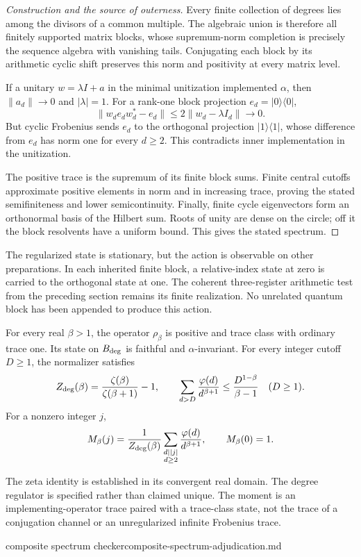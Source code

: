 \begin{proof}[Construction and the source of outerness]
Every finite collection of degrees lies among the divisors of a common
multiple. The algebraic union is therefore all finitely supported matrix
blocks, whose supremum-norm completion is precisely the sequence algebra
with vanishing tails. Conjugating each block by its arithmetic cyclic
shift preserves this norm and positivity at every matrix level.

If a unitary $w=\lambda I+a$ in the minimal unitization implemented
$\alpha$, then $\|a_d\|\to0$ and $|\lambda|=1$. For a rank-one block
projection $e_d=|0\rangle\langle0|$,
\[
 \|w_d e_d w_d^*-e_d\|\leq2\|w_d-\lambda I_d\|\longrightarrow0.
\]
But cyclic Frobenius sends $e_d$ to the orthogonal projection
$|1\rangle\langle1|$, whose difference from $e_d$ has norm one for
every $d\geq2$. This contradicts inner implementation in the unitization.

The positive trace is the supremum of its finite block sums. Finite
central cutoffs approximate positive elements in norm and in increasing
trace, proving the stated semifiniteness and lower semicontinuity.
Finally, finite cycle eigenvectors form an orthonormal basis of the Hilbert
sum. Roots of unity are dense on the circle; off it the block resolvents
have a uniform bound. This gives the stated spectrum.
\end{proof}

The regularized state is stationary, but the action is observable on
other preparations. In each inherited finite block, a relative-index
state at zero is carried to the orthogonal state at one. The coherent
three-register arithmetic test from the preceding section remains its
finite realization. No unrelated quantum block has been appended to
produce this action.

\begin{theorem}
\statusProved\quad
For every real $\beta>1$, the operator $\rho_\beta$ is positive and trace
class with ordinary trace one. Its state on $B_{\rm deg}$ is faithful
and $\alpha$-invariant. For every integer cutoff $D\geq1$, the normalizer satisfies
\[
 Z_{\rm deg}(\beta)=\frac{\zeta(\beta)}{\zeta(\beta+1)}-1,
 \qquad
 \sum_{d>D}\frac{\varphi(d)}{d^{\beta+1}}
       \leq\frac{D^{1-\beta}}{\beta-1}\quad(D\geq1).
\]
For a nonzero integer $j$,
\[
 M_\beta(j)=\frac1{Z_{\rm deg}(\beta)}
       \sum_{\substack{d\mid |j|\\d\geq2}}
              \frac{\varphi(d)}{d^{\beta+1}},
 \qquad M_\beta(0)=1.
\]
\end{theorem}
\begin{scope}
The zeta identity is established in its convergent real domain. The
degree regulator is specified rather than claimed unique. The moment is
an implementing-operator trace paired with a trace-class state, not the
trace of a conjugation channel or an unregularized infinite Frobenius trace.
\end{scope}
{composite spectrum checker}{composite-spectrum-adjudication.md}

